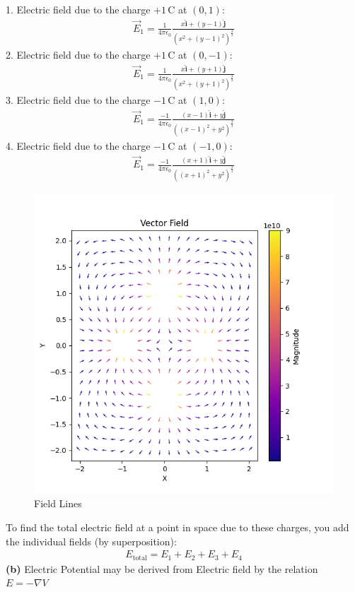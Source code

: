 \documentclass{article}
\begin{document}
1. Electric field due to the charge $ +1\,\mathrm{C} $ at $ (0, 1) $:
\begin{align*}
   \vec{E}_1 = \frac{1}{4 \pi \epsilon_0} \frac{x \mathbf{\hat{i}} + (y-1)\mathbf{\hat{j}} }{(x^2 + (y-1)^2 )^{\frac{3}{2}}}
\end{align*}
2. Electric field due to the charge $ +1\,\mathrm{C} $ at $ (0, -1) $:
\begin{align*}
   \vec{E}_1 = \frac{1}{4 \pi \epsilon_0} \frac{x \mathbf{\hat{i}} + (y+1)\mathbf{\hat{j}} }{(x^2 + (y+1)^2 )^{\frac{3}{2}}}
\end{align*}
3. Electric field due to the charge $ -1\,\mathrm{C} $ at $ (1, 0) $:
\begin{align*}
   \vec{E}_1 = \frac{-1}{4 \pi \epsilon_0} \frac{(x-1) \mathbf{\hat{i}} + y\mathbf{\hat{j}} }{((x-1)^2 + y^2 )^{\frac{3}{2}}}
\end{align*}
4. Electric field due to the charge $ -1\,\mathrm{C} $ at $ (-1, 0) $:
\begin{align*}
   \vec{E}_1 = \frac{-1}{4 \pi \epsilon_0} \frac{(x+1) \mathbf{\hat{i}} + y\mathbf{\hat{j}} }{((x+1)^2 + y^2 )^{\frac{3}{2}}}
\end{align*}
\begin{figure}[h!]
   \centering
   \includegraphics[width=0.6\columnwidth]{figs/field.png}
    \caption{Field Lines}
   \label{label}
\end{figure}
\pagebreak
To find the total electric field at a point in space due to these charges, you add the individual fields (by superposition):
\begin{align*}
E_{\text{total}} = E_1 + E_2 + E_3 + E_4
\end{align*}
\textbf{(b)} Electric Potential may be derived from Electric field by the relation $E = -\nabla V$
\end{document}
